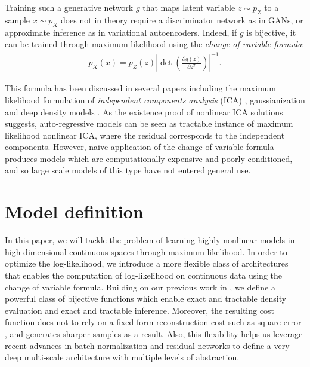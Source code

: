 \documentclass{article}
\begin{document}
Training such a generative network $g$ that maps latent variable $z \sim p_{Z}$ to a sample $x \sim p_{X}$ does not in theory require a discriminator network as in GANs, or approximate inference as in variational autoencoders. Indeed, if $g$ is bijective, it can be trained through maximum likelihood using the \emph{change of variable formula}:
\begin{align}
p_{X}(x) = p_{Z}(z) \left\vert \det\left(\frac{\partial g(z)}{\partial z^T}\right)\right\vert^{-1}
.
\end{align}

This formula has been discussed in several papers including the maximum likelihood formulation of \emph{independent components analysis} (ICA) \citep{bell1995information, hyvarinen2004independent}, gaussianization \citep{NIPS1994_901, chen2000gaussianization} and deep density models \citep{bengio1991artificial, rippel2013high, dinh2014nice, balle2015density}.
As the existence proof of nonlinear ICA solutions \citep{hyvarinen1999nonlinear} suggests, auto-regressive models can be seen as tractable instance of maximum likelihood nonlinear ICA, where the residual corresponds to the independent components.
However, naive application of the change of variable formula produces models which are computationally expensive and poorly conditioned, and so large scale models of this type have not entered general use.


\section{Model definition}
In this paper, we will tackle the problem of learning highly nonlinear models in high-dimensional continuous spaces through maximum likelihood. In order to optimize the log-likelihood, we introduce a more flexible class of architectures that enables the computation of log-likelihood on continuous data using the change of variable formula. Building on our previous work in \citep{dinh2014nice}, we define a powerful class of bijective functions which enable exact and tractable density evaluation and exact and tractable inference.
Moreover, the resulting cost function does not to rely on a fixed form reconstruction cost such as square error \citep{DBLP:journals/corr/LarsenSW15, DBLP:journals/corr/RadfordMC15}, and generates sharper samples as a result. Also, this flexibility helps us leverage recent advances in batch normalization \citep{ioffe2015batch} and residual networks \citep{DBLP:journals/corr/HeZRS15, DBLP:journals/corr/HeZR016} to define a very deep multi-scale architecture with multiple levels of abstraction.
\end{document}
